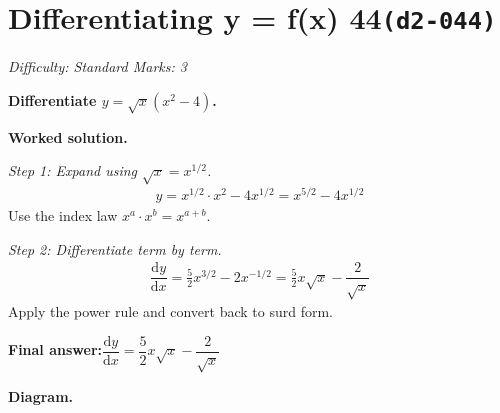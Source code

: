 \documentclass[11pt]{article}
\newcommand{\question}[1]{\par\medskip\noindent\textbf{#1}\par}
\begin{document}
\section*{Differentiating y = f(x) 44\quad\small\texttt{(d2-044)}}
\textit{Difficulty: Standard \quad\textbar\quad Marks: 3}

\question{Differentiate \( y = \sqrt{x}(x^2 - 4) \).}

\textbf{Worked solution.}

\textit{Step 1: Expand using \( \sqrt{x} = x^{1/2} \).}
\[\begin{gathered}
y = x^{1/2} \cdot x^2 - 4x^{1/2} = x^{5/2} - 4x^{1/2}
\end{gathered}\]
Use the index law \( x^a \cdot x^b = x^{a+b} \).

\textit{Step 2: Differentiate term by term.}
\[\begin{gathered}
\dfrac{\mathrm{d}y}{\mathrm{d}x} = \tfrac{5}{2}x^{3/2} - 2x^{-1/2} = \tfrac{5}{2}x\sqrt{x} - \dfrac{2}{\sqrt{x}}
\end{gathered}\]
Apply the power rule and convert back to surd form.

\begin{answerbox}
\textbf{Final answer:}\quad \(\displaystyle  \dfrac{\mathrm{d}y}{\mathrm{d}x} = \dfrac{5}{2}x\sqrt{x} - \dfrac{2}{\sqrt{x}} \)
\end{answerbox}
\textbf{Diagram.}
\end{document}

